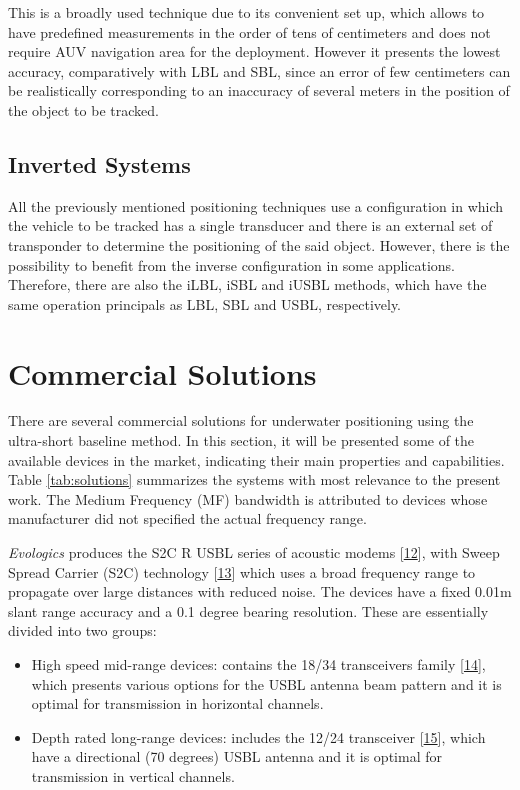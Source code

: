 This is a broadly used technique due to its convenient set up, which allows to have predefined measurements in the order of tens of centimeters and does not require AUV navigation area for the deployment. However it presents the lowest accuracy, comparatively with LBL and SBL, since an error of few centimeters can be realistically corresponding to an inaccuracy of several meters in the position of the object to be tracked.

\subsection{Inverted Systems}

All the previously mentioned positioning techniques use a configuration in which the vehicle to be tracked has a single transducer and there is an external set of transponder to determine the positioning of the said object. However, there is the possibility to benefit from the inverse configuration in some applications. Therefore, there are also the iLBL, iSBL and iUSBL methods, which have the same operation principals as LBL, SBL and USBL, respectively.


\section{Commercial Solutions}

There are several commercial solutions for underwater positioning using the ultra-short baseline method. In this section, it will be presented some of the available devices in the market, indicating their main properties and capabilities. Table \ref{tab:solutions} summarizes the systems with most relevance to the present work. The Medium Frequency (MF) bandwidth is attributed to devices whose manufacturer did not specified the actual frequency range.

\textit{Evologics} produces the S2C R USBL series of acoustic modems [\hyperref[r:evologics1]{12}], with Sweep Spread Carrier (S2C) technology [\hyperref[r:evologics2]{13}] which uses a broad frequency range to propagate over large distances with reduced noise. The devices have a fixed 0.01m slant range accuracy and a 0.1 degree bearing resolution. These are essentially divided into two groups:
\begin{itemize}
	\item High speed mid-range devices: contains the 18/34 transceivers family [\hyperref[r:evologics3]{14}], which presents various options for the USBL antenna beam pattern and it is optimal for transmission in horizontal channels.
	\item Depth rated long-range devices: includes the 12/24 transceiver [\hyperref[r:evologics4]{15}], which have a directional (70 degrees) USBL antenna  and it is optimal for transmission in vertical channels.
\end{itemize}

